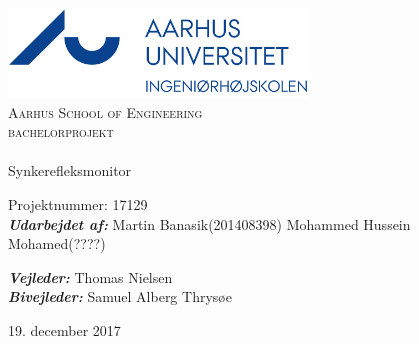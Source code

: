
\begin{titlingpage}
\begin{center}

~ \\[3cm]

\includegraphics[width=0.6\textwidth]{figure/AU}~\\[1cm]

\textsc{\LARGE Aarhus School of Engineering}\\[1.5cm]

\textsc{\Large bachelorprojekt}\\

\noindent\makebox[\linewidth]{\rule{\textwidth}{0.4pt}}\\
[0.5cm]{\Huge Synkerefleksmonitor}
\noindent\makebox[\linewidth]{\rule{\textwidth}{0.4pt}}

\end{center}


Projektnummer: 17129 \newline\\
\textbf{\textit{Udarbejdet af:}} \newline
Martin Banasik\tab(201408398) \newline	
Mohammed Hussein Mohamed\tab(????) \newline	





\textbf{\textit{Vejleder:}} \newline
Thomas Nielsen\\
\textbf{\textit{Bivejleder:}} \newline
Samuel Alberg Thrysøe\\


\vfill

\begin{center}
{\large 19. december 2017}
\end{center}


\end{titlingpage}